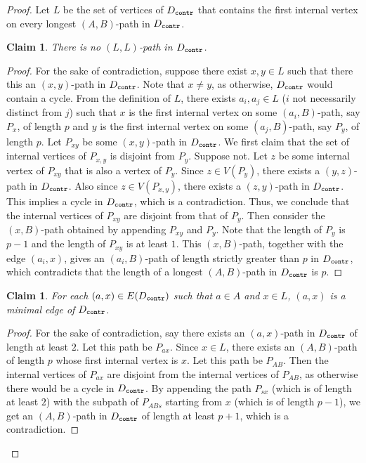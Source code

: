 \documentclass[a4paper,11pt]{article}
\theoremstyle{plain}
\newtheorem{claim}[theorem]{Claim}
\newtheorem{identification rule}{Identification Rule}
\theoremstyle{definition}
\theoremstyle{remark}
\newenvironment{claimproof}{\begin{proof}\renewcommand{\qedsymbol}{\claimqed}}{\end{proof}\renewcommand{\qedsymbol}{\plainqed}}
\let\plainqed\qedsymbol
\newcommand{\claimqed}{$\lrcorner$}
\newcommand{\contr}{\textnormal{\texttt{contr}}}
\newcommand{\Dcontr}{D_{\contr}}
\begin{document}
\begin{proof}
Let $L$ be the set of vertices of $\Dcontr$ that contains the first internal vertex on every longest $(A,B)$-path in $\Dcontr$.

\begin{claim}\label{claim:biclique6}
There is no $(L,L)$-path in $\Dcontr$.
\end{claim}

\begin{claimproof}
For the sake of contradiction, suppose there exist $x,y \in L$ such that there this an $(x,y)$-path in $\Dcontr$. Note that $x\neq y$, as otherwise, $\Dcontr$ would contain a cycle.
From the definition of $L$, there exists $a_i,a_j \in L$ ($i$ not necessarily distinct from $j$) such that $x$ is the first internal vertex on some $(a_i,B)$-path, say $P_x$, of length $p$ and $y$ is the first internal vertex on some $(a_j,B)$-path, say $P_y$, of length $p$. 
Let $P_{xy}$ be some $(x,y)$-path in $\Dcontr$. We first claim that the set of internal vertices of $P_{x,y}$ is disjoint from $P_y$. Suppose not. Let $z$ be some internal vertex of $P_{xy}$ that is also a vertex of $P_y$. Since $z \in V(P_y)$, there exists a $(y,z)$-path in $\Dcontr$. Also since $z \in V(P_{x,y})$, there exists a $(z,y)$-path in $\Dcontr$. This implies a cycle in $\Dcontr$, which is a contradiction. Thus, we conclude that the internal vertices of $P_{xy}$ are disjoint from that of $P_y$. Then consider the $(x,B)$-path obtained by appending $P_{xy}$ and $P_y$. Note that the length of $P_y$ is $p-1$ and the length of $P_{xy}$ is at least $1$. This $(x,B)$-path, together with the edge $(a_i,x)$, gives an $(a_i,B)$-path of length strictly greater than $p$ in $\Dcontr$, which contradicts that the length of a longest $(A,B)$-path in $\Dcontr$ is $p$.
\end{claimproof}

\begin{claim}\label{claim:biclique7}
For each $(a,x) \in E(\Dcontr)$ such that $a \in A$ and $x \in L$, $(a,x)$ is a minimal edge of $\Dcontr$. 
\end{claim}

\begin{claimproof}
For the sake of contradiction, say there exists an $(a,x)$-path in $\Dcontr$ of length at least $2$. Let this path be $P_{ax}$. Since $x \in L$, there exists an $(A,B)$-path of length $p$ whose first internal vertex is $x$. Let this path be $P_{AB}$. Then the internal vertices of $P_{ax}$ are disjoint from the internal vertices of $P_{AB}$, as otherwise there would be a cycle in $\Dcontr$. By appending the path $P_{sx}$ (which is of length at least $2$) with the subpath of $P_{ABs}$ starting from $x$ (which is of length $p-1$), we get an $(A,B)$-path in $\Dcontr$ of length at least $p+1$, which is a contradiction.
\end{claimproof}


\end{proof}
\end{document}
